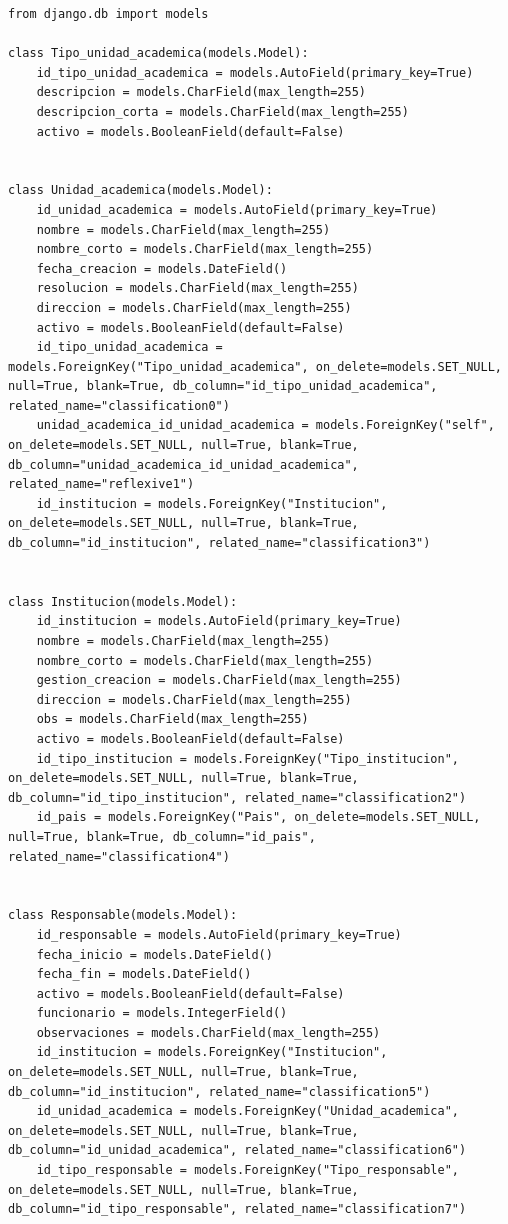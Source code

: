 \begin{lstlisting}[caption={Extracto del código \texttt{models.py} generado para el subsistema institucional}, label={anx:codigo-caso-institucional}]
from django.db import models

class Tipo_unidad_academica(models.Model):
    id_tipo_unidad_academica = models.AutoField(primary_key=True)
    descripcion = models.CharField(max_length=255)
    descripcion_corta = models.CharField(max_length=255)
    activo = models.BooleanField(default=False)


class Unidad_academica(models.Model):
    id_unidad_academica = models.AutoField(primary_key=True)
    nombre = models.CharField(max_length=255)
    nombre_corto = models.CharField(max_length=255)
    fecha_creacion = models.DateField()
    resolucion = models.CharField(max_length=255)
    direccion = models.CharField(max_length=255)
    activo = models.BooleanField(default=False)
    id_tipo_unidad_academica = models.ForeignKey("Tipo_unidad_academica", on_delete=models.SET_NULL, null=True, blank=True, db_column="id_tipo_unidad_academica", related_name="classification0")
    unidad_academica_id_unidad_academica = models.ForeignKey("self", on_delete=models.SET_NULL, null=True, blank=True, db_column="unidad_academica_id_unidad_academica", related_name="reflexive1")
    id_institucion = models.ForeignKey("Institucion", on_delete=models.SET_NULL, null=True, blank=True, db_column="id_institucion", related_name="classification3")


class Institucion(models.Model):
    id_institucion = models.AutoField(primary_key=True)
    nombre = models.CharField(max_length=255)
    nombre_corto = models.CharField(max_length=255)
    gestion_creacion = models.CharField(max_length=255)
    direccion = models.CharField(max_length=255)
    obs = models.CharField(max_length=255)
    activo = models.BooleanField(default=False)
    id_tipo_institucion = models.ForeignKey("Tipo_institucion", on_delete=models.SET_NULL, null=True, blank=True, db_column="id_tipo_institucion", related_name="classification2")
    id_pais = models.ForeignKey("Pais", on_delete=models.SET_NULL, null=True, blank=True, db_column="id_pais", related_name="classification4")


class Responsable(models.Model):
    id_responsable = models.AutoField(primary_key=True)
    fecha_inicio = models.DateField()
    fecha_fin = models.DateField()
    activo = models.BooleanField(default=False)
    funcionario = models.IntegerField()
    observaciones = models.CharField(max_length=255)
    id_institucion = models.ForeignKey("Institucion", on_delete=models.SET_NULL, null=True, blank=True, db_column="id_institucion", related_name="classification5")
    id_unidad_academica = models.ForeignKey("Unidad_academica", on_delete=models.SET_NULL, null=True, blank=True, db_column="id_unidad_academica", related_name="classification6")
    id_tipo_responsable = models.ForeignKey("Tipo_responsable", on_delete=models.SET_NULL, null=True, blank=True, db_column="id_tipo_responsable", related_name="classification7")
\end{lstlisting}

